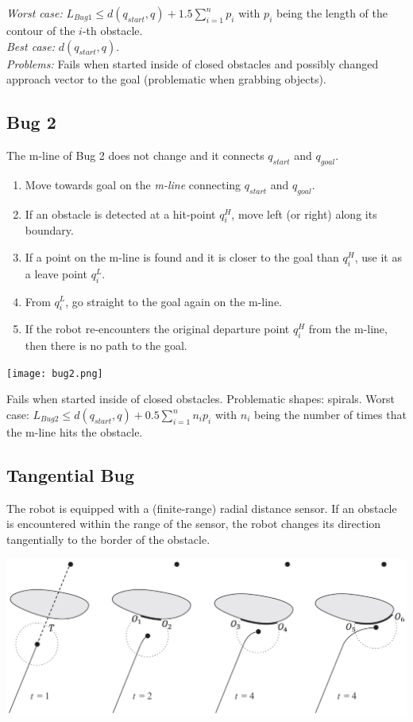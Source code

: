 \begin{multicols*}{2}
\noindent \textit{Worst case:} $L_{Bug1} \leq d(q_{start}, q)+1.5\sum_{i=1}^{n} p_i$ with $p_i$ being the length of the contour of the $i$-th obstacle.\\
\textit{Best case:} $d(q_{start}, q)$.\\
\textit{Problems:} Fails when started inside of closed obstacles and possibly changed approach vector to the goal (problematic when grabbing objects).

\subsection{Bug 2}
The m-line of Bug 2 does not change and it connects $q_{start}$ and $q_{goal}$.
\begin{enumerate}
	\item Move towards goal on the \textit{m-line} connecting $q_{start}$ and $q_{goal}$.
	\item If an obstacle is detected at a hit-point $q^H_i$, move left (or right) along its boundary.
	\item If a point on the m-line is found and it is closer to the goal than $q^H_i$, use it as a leave point $q^L_i$.
	\item From $q^L_i$, go straight to the goal again on the m-line.
	\item If the robot re-encounters the original departure point $q^H_i$ from the m-line, then there is no path to the goal.
\end{enumerate}
\begin{center}
\texttt{[image: bug2.png]}
\end{center}

\noindent Fails when started inside of closed obstacles. Problematic shapes: spirals. Worst case: $L_{Bug2} \leq d(q_{start}, q)+0.5\sum_{i=1}^{n} n_i p_i$ with $n_i$ being the number of times that the m-line hits the obstacle.

\subsection{Tangential Bug}
The robot is equipped with a (finite-range) radial distance sensor. If an obstacle is encountered within the range of the sensor, the robot changes its direction tangentially to the border of the obstacle.

\begin{center}
	\includegraphics[width=\columnwidth]{tangential_bug.png}
\end{center}


\end{multicols*}
